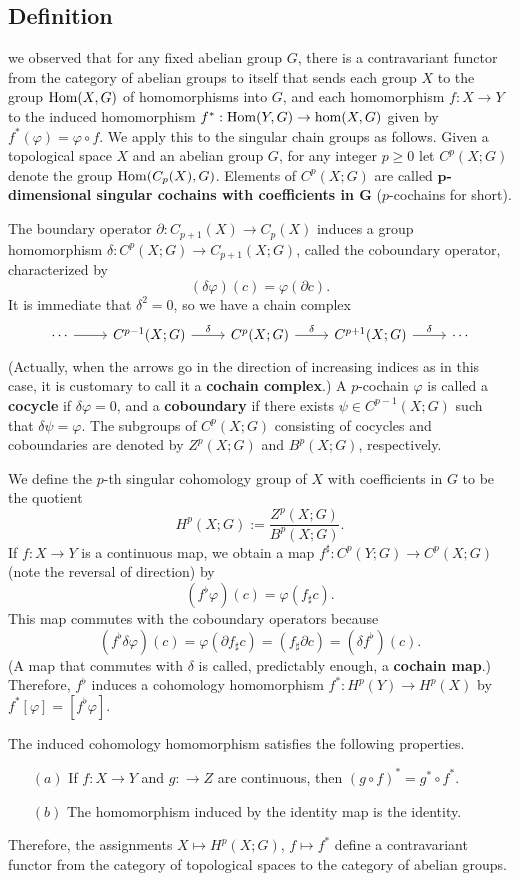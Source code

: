 \subsection{Definition}
we observed that for any fixed abelian group $G$, there is a contravariant functor from the category of abelian groups to itself that sends each group $X$ to the group $\mathrm{Hom}(X,G)$ of homomorphisms into $G$, and each homomorphism $f:X\to Y$ to the induced homomorphism $f^*:\mathrm{Hom}(Y,G)\to\hom(X,G)$ given
by $f^*(\varphi)=\varphi\circ f$. We apply this to the singular chain groups as follows. Given a topological space $X$ and an abelian group $G$, for any integer $p\geq0$ let $C^p(X;G)$ denote the group $\mathrm{Hom}(C_p(X),G)$. Elements of $C^p(X;G)$ are called \textbf{$\bm{p}$-dimensional singular cochains with coefficients in $\bm{G}$} ($p$-cochains for short).\par
The boundary operator $\partial:C_{p+1}(X)\to C_p(X)$ induces a group homomorphism $\delta:C^p(X;G)\to C_{p+1}(X;G)$, called the coboundary operator, characterized by
\[(\delta\varphi)(c)=\varphi(\partial c).\]
It is immediate that $\delta^2=0$, so we have a chain complex
\[\begin{tikzcd}
\cdots\ar[r]&C^{p-1}(X;G)\ar[r,"\delta"]&C^{p}(X;G)\ar[r,"\delta"]&C^{p+1}(X;G)\ar[r,"\delta"]&\cdots
\end{tikzcd}\]
(Actually, when the arrows go in the direction of increasing indices as in this case, it is customary to call it a \textbf{cochain complex}.) A $p$-cochain $\varphi$ is called a \textbf{cocycle} if $\delta\varphi=0$, and a \textbf{coboundary} if there exists $\psi\in C^{p-1}(X;G)$ such that $\delta\psi=\varphi$. The subgroups of $C^p(X;G)$ consisting of cocycles and coboundaries are denoted by $Z^p(X;G)$ and $B^p(X;G)$, respectively.\par
We define the $p$-th singular cohomology group of $X$ with coefficients in $G$ to be the quotient
\[H^p(X;G):=\dfrac{Z^p(X;G)}{B^p(X;G)}.\]
If $f:X\to Y$ is a continuous map, we obtain a map $f^\sharp:C^p(Y;G)\to C^p(X;G)$ (note the reversal of direction) by 
\[(f^\flat\varphi)(c)=\varphi(f_\sharp c).\]
This map commutes with the coboundary operators because
\[(f^\flat\delta\varphi)(c)=\varphi(\partial f_\sharp c)=(f_\sharp\partial c)=(\delta f^\flat)(c).\]
(A map that commutes with $\delta$ is called, predictably enough, a \textbf{cochain map}.) Therefore,
$f^\flat$ induces a cohomology homomorphism $f^*:H^p(Y)\to H^p(X)$ by $f^*[\varphi]=[f^\flat\varphi]$.
\begin{proposition}
The induced cohomology homomorphism satisfies the following properties.
\begin{itemize}
\item[$(a)$]If $f:X\to Y$ and $g:\to Z$ are continuous, then $(g\circ f)^*=g^*\circ f^*$.
\item[$(b)$]The homomorphism induced by the identity map is the identity.
\end{itemize}
Therefore, the assignments $X\mapsto H^p(X;G)$, $f\mapsto f^*$ define a contravariant functor from the category of topological spaces to the category of abelian groups.
\end{proposition}
